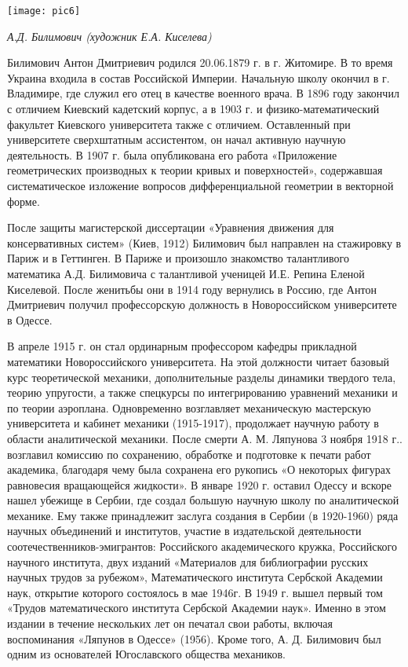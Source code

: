\begin{center}
\texttt{[image: pic6]}

{\it А.Д. Билимович (художник Е.А. Киселева)}
\end{center}

Билимович Антон Дмитриевич родился 20.06.1879 г. в г. Житомире. В то время Украина входила в состав Российской Империи. Начальную школу окончил в г. Владимире, где служил его отец в качестве военного врача. В 1896 году закончил с отличием Киевский кадетский корпус, а в 1903 г. и физико-математический факультет Киевского университета также с отличием. Оставленный при университете сверхштатным ассистентом, он начал активную научную деятельность. В 1907 г. была опубликована его работа «Приложение геометрических производных к теории кривых и поверхностей», содержавшая систематическое изложение вопросов дифференциальной геометрии в векторной форме.

После защиты магистерской диссертации «Уравнения движения для консервативных систем» (Киев, 1912) Билимович был направлен на стажировку в Париж и в Геттинген. В Париже и произошло знакомство талантливого математика А.Д. Билимовича с талантливой ученицей И.Е. Репина Еленой Киселевой. После женитьбы они в 1914 году вернулись в Россию, где Антон Дмитриевич получил профессорскую должность в Новороссийском университете в Одессе.

В апреле 1915 г. он стал ординарным профессором кафедры прикладной математики Новороссийского университета. На этой должности читает базовый курс теоретической механики, дополнительные разделы динамики твердого тела, теорию упругости, а также спецкурсы по интегрированию уравнений механики и по теории аэроплана. Одновременно возглавляет механическую мастерскую университета и кабинет механики (1915-1917), продолжает научную работу в области аналитической механики.
После смерти А. М. Ляпунова 3 ноября 1918 г.. возглавил комиссию по сохранению, обработке и подготовке к печати работ академика, благодаря чему была сохранена его рукопись «О некоторых фигурах равновесия вращающейся жидкости».
В январе 1920 г. оставил Одессу и вскоре нашел убежище в Сербии, где создал большую научную школу по аналитической механике. Ему также принадлежит заслуга создания в Сербии (в 1920-1960) ряда научных объединений и институтов, участие в издательской деятельности соотечественников-эмигрантов: Российского академического кружка, Российского научного института, двух изданий «Материалов для библиографии русских научных трудов за рубежом», Математического института Сербской Академии наук, открытие которого состоялось в мае 1946г. В 1949 г. вышел первый том «Трудов математического института Сербской Академии наук». Именно в этом издании в течение нескольких лет он печатал свои работы, включая воспоминания «Ляпунов в Одессе» (1956). Кроме того, А. Д. Билимович был одним из основателей Югославского общества механиков.

